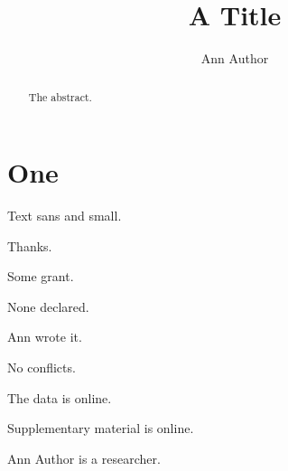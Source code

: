 \documentclass[Afour,sageh,times]{sagej}
\begin{document}
\title{A Title}
\author{Ann Author}
\begin{abstract}The abstract.\end{abstract}
\maketitle
\section{One}
Text {\sagesf sans} and { small}.
\begin{acks}Thanks.\end{acks}
\begin{funding}Some grant.\end{funding}
\begin{dci}None declared.\end{dci}
\begin{credit}Ann wrote it.\end{credit}
\begin{conflict}No conflicts.\end{conflict}
\begin{das}The data is online.\end{das}
\begin{sm}Supplementary material is online.\end{sm}
\begin{biogs}Ann Author is a researcher.\end{biogs}
\end{document}
